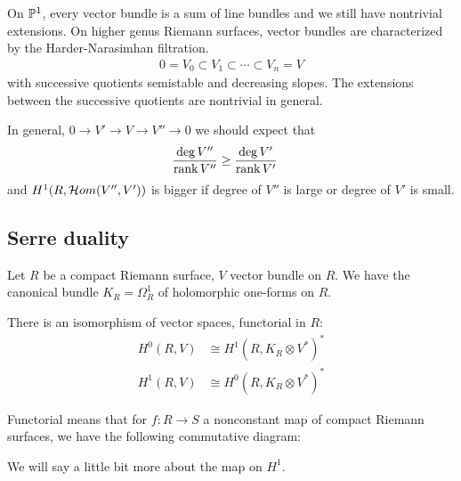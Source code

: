 \documentclass[12pt]{article}
\begin{document}
\begin{remark}
    On $\P^1$, every vector bundle is a sum of line bundles and we still have nontrivial extensions. On higher genus Riemann surfaces, vector bundles are characterized by the Harder-Narasimhan filtration. \begin{align*}
        0 = V_0 \subset V_1 \subset \cdots \subset V_n = V
    \end{align*} with successive quotients semistable and decreasing slopes. The extensions between the successive quotients are nontrivial in general.

    In general, $0 \to V' \to V \to V'' \to 0$ we should expect that \begin{align*}
        \frac{\deg V''}{\rank V''} &\geq \frac{\deg V'}{\rank V'}
    \end{align*} and $H^1(R, \cH om(V'', V'))$ is bigger if degree of $V''$ is large or degree of $V'$ is small.
\end{remark}

\subsection{Serre duality}

Let $R$ be a compact Riemann surface, $V$ vector bundle on $R$. We have the canonical bundle $K_R = \Omega_R^1$ of holomorphic one-forms on $R$.

\begin{theorem}
    There is an isomorphism of vector spaces, functorial in $R$:
    \begin{align*}
        H^0(R, V) & \cong H^1(R, K_R \otimes V^*)^* \\
        H^1(R, V) & \cong H^0(R, K_R \otimes V^*)^*
    \end{align*}
\end{theorem}
Functorial means that for $f: R \to S$ a nonconstant map of compact Riemann surfaces, we have the following commutative diagram:
\begin{center}
\end{center}
We will say a little bit more about the map on $H^1$.
\end{document}
